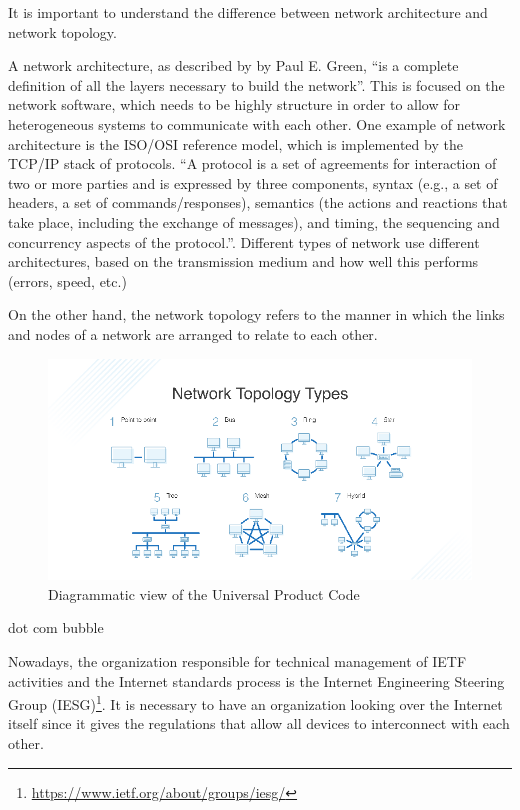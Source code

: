 	It is important to understand the difference between network architecture and network topology.
	
	A network architecture, as described by by Paul E. Green, ``is a complete definition of all the layers necessary to build the network''\cite{nla.cat-vn252493}.
	This is focused on the network software, which needs to be highly structure in order to allow for heterogeneous systems to communicate with each other.
	One example of network architecture is the ISO/OSI reference model, which is implemented by the TCP/IP stack of protocols.
	``A protocol is a set of agreements for interaction of two or more parties and is expressed by three components, syntax (e.g., a set of headers, a set of commands/responses), semantics (the actions and reactions that take place, including the exchange of messages), and timing, the sequencing and concurrency aspects of the protocol.''\cite{nla.cat-vn252493}.
	Different types of network use different architectures, based on the transmission medium and how well this performs (errors, speed, etc.)
	
	On the other hand, the network topology refers to the manner in which the links and nodes of a network are arranged to relate to each other.
	
	
	\begin{figure}[h!]
		\centering
		\includegraphics[width=\textwidth-4cm]{resources/img/chap3/network_topologies.png}
		\caption{Diagrammatic view of the Universal Product Code}
		\label{fig:upc_patent}
	\end{figure}
	
	dot com bubble
	
	Nowadays, the organization responsible for technical management of IETF activities and the Internet standards process is the Internet Engineering Steering Group (IESG)\footnote{\url{https://www.ietf.org/about/groups/iesg/}}.
	It is necessary to have an organization looking over the Internet itself since it gives the regulations that allow all devices to interconnect with each other.
	
